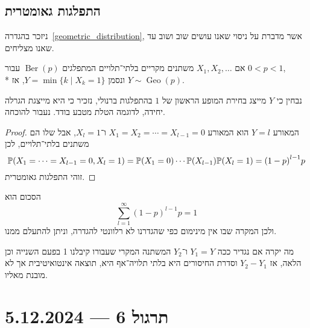 \subsection{התפלגות גאומטרית}
ניזכר בהגדרה\ \ref{geometric_distribution}, אשר מדברת על ניסוי שאנו עושים שוב ושוב עד שאנו מצליחים.
\begin{proposition}
	אם $X_1, X_2, \dots$ משתנים מקריים בלתי־תלויים המתפלגים $\operatorname{Ber}(p)$ עבור $0 < p < 1$, \\*
	ונסמן $Y = \min \{ k \mid X_k = 1 \}$, אז $Y \sim \operatorname{Geo}(p)$.
\end{proposition}
נבחין כי $Y$ מייצג בחירת המופע הראשון של $1$ בהתפלגות ברנולי, נזכיר כי היא מייצגת הגרלה יחידה, לדוגמה הטלת מטבע בודד. נעבור להוכחה.
\begin{proof}
	המאורע $Y = l$ הוא המאורע $X_1 = X_2 = \cdots = X_{l - 1} = 0$ ו־$X_l = 1$, אבל שלו הם משתנים בלתי־תלויים, לכן
	\[
		\mathbb{P}(X_1 = \cdots = X_{l - 1} = 0, X_l = 1)
		= \mathbb{P}(X_1 = 0) \cdots \mathbb{P}(X_{l - 1}) \mathbb{P}(X_l = 1)
		= {(1 - p)}^{l - 1} p
	\]
	זוהי התפלגות גאומטרית.
\end{proof}
\begin{remark}
	הסכום הוא
	\[
		\sum_{l = 1}^{\infty} {(1 - p)}^{l - 1} p = 1
	\]
	ולכן המקרה שבו אין מינימום כפי שהגדרנו לא רלוונטי להגדרה, וניתן להתעלם ממנו.
\end{remark}
מה יקרה אם נגדיר ככה $Y_1 = Y$ ו־$Y_2$ המשתנה המקרי שעבורו קיבלנו 1 בפעם השנייה וכן הלאה, אז $Y_2 - Y_1$ וסדרת החיסורים היא בלתי תלויה־אף היא, תוצאה אינטואיטיבית אך לא מובנת מאליו.

\section{תרגול 6 --- 5.12.2024}
